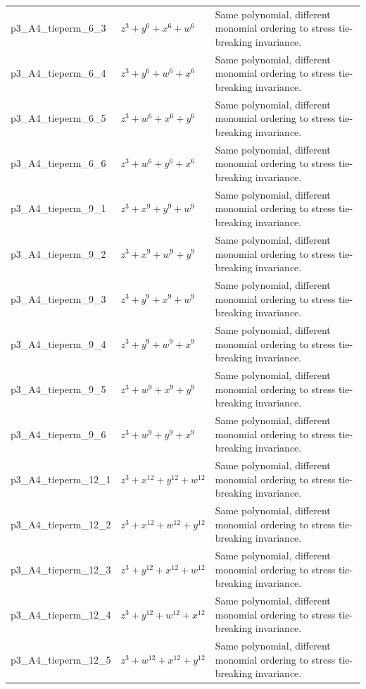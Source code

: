\documentclass[11pt]{amsart}
\begin{document}
\begin{longtable}{@{}p{} p{} p{}@{}}
p3\_A4\_tieperm\_6\_3 & $z^{3} + y^{6} + x^{6} + w^{6}$ & Same polynomial, different monomial ordering to stress tie-breaking invariance. \\
p3\_A4\_tieperm\_6\_4 & $z^{3} + y^{6} + w^{6} + x^{6}$ & Same polynomial, different monomial ordering to stress tie-breaking invariance. \\
p3\_A4\_tieperm\_6\_5 & $z^{3} + w^{6} + x^{6} + y^{6}$ & Same polynomial, different monomial ordering to stress tie-breaking invariance. \\
p3\_A4\_tieperm\_6\_6 & $z^{3} + w^{6} + y^{6} + x^{6}$ & Same polynomial, different monomial ordering to stress tie-breaking invariance. \\
p3\_A4\_tieperm\_9\_1 & $z^{3} + x^{9} + y^{9} + w^{9}$ & Same polynomial, different monomial ordering to stress tie-breaking invariance. \\
p3\_A4\_tieperm\_9\_2 & $z^{3} + x^{9} + w^{9} + y^{9}$ & Same polynomial, different monomial ordering to stress tie-breaking invariance. \\
p3\_A4\_tieperm\_9\_3 & $z^{3} + y^{9} + x^{9} + w^{9}$ & Same polynomial, different monomial ordering to stress tie-breaking invariance. \\
p3\_A4\_tieperm\_9\_4 & $z^{3} + y^{9} + w^{9} + x^{9}$ & Same polynomial, different monomial ordering to stress tie-breaking invariance. \\
p3\_A4\_tieperm\_9\_5 & $z^{3} + w^{9} + x^{9} + y^{9}$ & Same polynomial, different monomial ordering to stress tie-breaking invariance. \\
p3\_A4\_tieperm\_9\_6 & $z^{3} + w^{9} + y^{9} + x^{9}$ & Same polynomial, different monomial ordering to stress tie-breaking invariance. \\
p3\_A4\_tieperm\_12\_1 & $z^{3} + x^{12} + y^{12} + w^{12}$ & Same polynomial, different monomial ordering to stress tie-breaking invariance. \\
p3\_A4\_tieperm\_12\_2 & $z^{3} + x^{12} + w^{12} + y^{12}$ & Same polynomial, different monomial ordering to stress tie-breaking invariance. \\
p3\_A4\_tieperm\_12\_3 & $z^{3} + y^{12} + x^{12} + w^{12}$ & Same polynomial, different monomial ordering to stress tie-breaking invariance. \\
p3\_A4\_tieperm\_12\_4 & $z^{3} + y^{12} + w^{12} + x^{12}$ & Same polynomial, different monomial ordering to stress tie-breaking invariance. \\
p3\_A4\_tieperm\_12\_5 & $z^{3} + w^{12} + x^{12} + y^{12}$ & Same polynomial, different monomial ordering to stress tie-breaking invariance. \\

\end{longtable}
\end{document}
